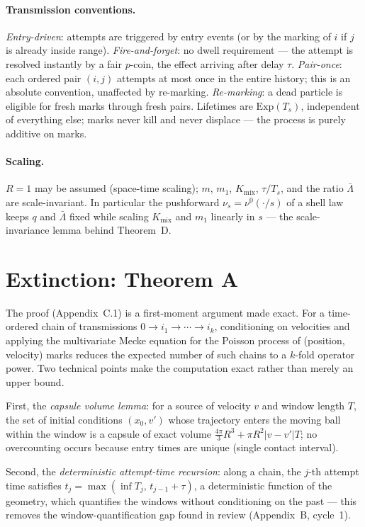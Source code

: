 \documentclass[11pt]{article}
\newcommand{\Kmix}{K_{\mathrm{mix}}}
\newcommand{\Ts}{T_s}
\newcommand{\relL}{\bar\Lambda}
\begin{document}
\paragraph{Transmission conventions.} \emph{Entry-driven}: attempts are
triggered by entry events (or by the marking of $i$ if $j$ is already inside
range). \emph{Fire-and-forget}: no dwell requirement --- the attempt is
resolved instantly by a fair $p$-coin, the effect arriving after delay
$\tau$. \emph{Pair-once}: each ordered pair $(i,j)$ attempts at most once in
the entire history; this is an absolute convention, unaffected by
re-marking. \emph{Re-marking}: a dead particle is eligible for fresh marks
through fresh pairs. Lifetimes are $\mathrm{Exp}(\Ts)$, independent of
everything else; marks never kill and never displace --- the process is
purely additive on marks.

\paragraph{Scaling.} $R=1$ may be assumed (space-time scaling); $m$, $m_1$,
$\Kmix$, $\tau/\Ts$, and the ratio $\relL$ are scale-invariant. In particular
the pushforward $\nu_s=\nu^0(\cdot/s)$ of a shell law keeps $q$ and $\relL$
fixed while scaling $\Kmix$ and $m_1$ linearly in $s$ --- the scale-invariance
lemma behind Theorem~D.

\section{Extinction: Theorem A}\label{sec:thmA}

The proof (Appendix~C.1) is a first-moment argument made exact. For a
time-ordered chain of transmissions
$0\to i_1\to\cdots\to i_k$, conditioning on velocities and applying the
multivariate Mecke equation \cite{lastpenrose} for the Poisson process of
(position, velocity) marks reduces the expected number of such chains to a
$k$-fold operator power. Two technical points make the computation exact
rather than merely an upper bound.

First, the \emph{capsule volume lemma}: for a source of velocity $v$ and
window length $T$, the set of initial conditions $(x_0,v')$ whose trajectory
enters the moving ball within the window is a capsule of exact volume
$\tfrac{4\pi}{3}R^3+\pi R^2|v-v'|T$; no overcounting occurs because entry
times are unique (single contact interval).

Second, the \emph{deterministic attempt-time recursion}: along a chain, the
$j$-th attempt time satisfies $t_j=\max(\inf T_j,\,t_{j-1}+\tau)$, a
deterministic function of the geometry, which quantifies the windows without
conditioning on the past --- this removes the window-quantification gap found
in review (Appendix~B, cycle~1).
\end{document}
